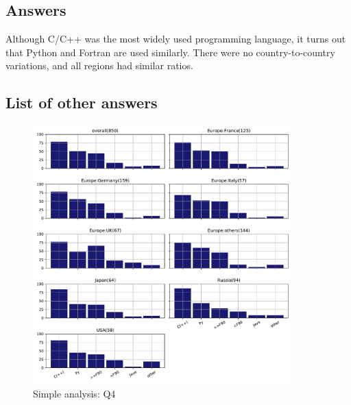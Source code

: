 
\subsection{Answers}


Although C/C++ was the most widely used programming language, 
it turns out that Python and Fortran are used similarly. 
There were no country-to-country variations, and all regions 
had similar ratios.

\subsection{List of other answers}
\begin{itemize}

\end{itemize}

\begin{figure}[htb]
\begin{center}
\includegraphics[width=10cm]{../pdfs/Q4.pdf}
\caption{Simple analysis: Q4}
\label{fig:Q4}
\end{center}
\end{figure}
